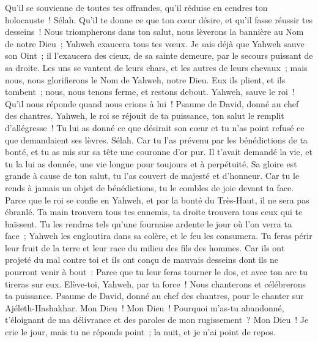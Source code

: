 \begin{multicols}{2}
Qu'il se souvienne de toutes tes offrandes, qu'il réduise en cendres ton holocauste~! Sélah.
Qu'il te donne ce que ton cœur désire, et qu'il fasse réussir tes desseins~!
Nous triompherons dans ton salut, nous lèverons la bannière au Nom de notre Dieu~; Yahweh exaucera tous tes vœux.
Je sais déjà que Yahweh sauve son Oint~; il l'exaucera des cieux, de sa sainte demeure, par le secours puissant de sa droite.
Les uns se vantent de leurs chars, et les autres de leurs chevaux~; mais nous, nous glorifierons le Nom de Yahweh, notre Dieu.
Eux ils plient, et ils tombent~; nous, nous tenons ferme, et restons debout.
Yahweh, sauve le roi~! Qu'il nous réponde quand nous crions à lui~!
\VerseOne{}Psaume de David, donné au chef des chantres.
Yahweh, le roi se réjouit de ta puissance, ton salut le remplit d'allégresse~!
Tu lui as donné ce que désirait son cœur et tu n'as point refusé ce que demandaient ses lèvres. Sélah.
Car tu l'as prévenu par les bénédictions de ta bonté, et tu as mis sur sa tête une couronne d'or pur.
Il t'avait demandé la vie, et tu la lui as donnée, une vie longue pour toujours et à perpétuité.
Sa gloire est grande à cause de ton salut, tu l'as couvert de majesté et d'honneur.
Car tu le rends à jamais un objet de bénédictions, tu le combles de joie devant ta face.
Parce que le roi se confie en Yahweh, et par la bonté du Très-Haut, il ne sera pas ébranlé.
Ta main trouvera tous tes ennemis, ta droite trouvera tous ceux qui te haïssent.
Tu les rendras tels qu'une fournaise ardente le jour où l'on verra ta face~; Yahweh les engloutira dans sa colère, et le feu les consumera.
Tu feras périr leur fruit de la terre et leur race du milieu des fils des hommes.
Car ils ont projeté du mal contre toi et ils ont conçu de mauvais desseins dont ils ne pourront venir à bout~:
Parce que tu leur feras tourner le dos, et avec ton arc tu tireras sur eux.
Elève-toi, Yahweh, par ta force~! Nous chanterons et célébrerons ta puissance.
\VerseOne{}Psaume de David, donné au chef des chantres, pour le chanter sur Ajéleth-Hashakhar.
Mon Dieu~! Mon Dieu~! Pourquoi m'as-tu abandonné, t'éloignant de ma délivrance et des paroles de mon rugissement~?
Mon Dieu~! Je crie le jour, mais tu ne réponds point~; la nuit, et je n'ai point de repos.

\end{multicols}
